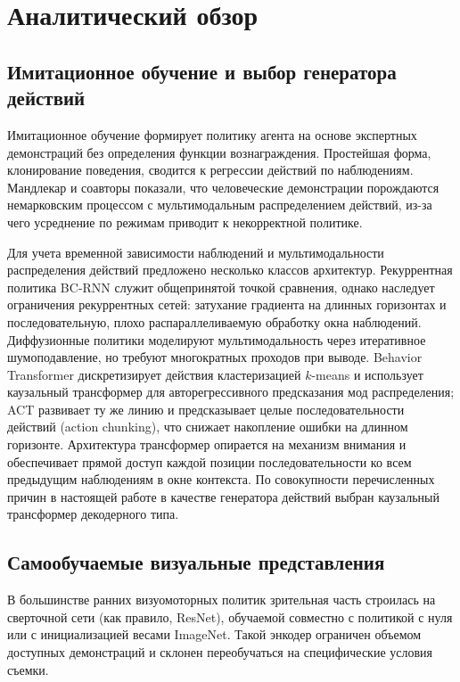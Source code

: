 \chapter{Аналитический обзор}
\label{ch:chap1}

\section{Имитационное обучение и выбор генератора действий}

Имитационное обучение формирует политику агента на основе экспертных демонстраций без определения
функции вознаграждения. Простейшая форма, клонирование поведения, сводится к регрессии действий по
наблюдениям. Мандлекар и соавторы \cite{mandlekar2021robomimic} показали, что человеческие демонстрации
порождаются немарковским процессом с мультимодальным распределением действий, из-за чего усреднение по
режимам приводит к некорректной политике.

Для учета временной зависимости наблюдений и мультимодальности распределения действий предложено несколько классов архитектур. Рекуррентная политика BC-RNN \cite{mandlekar2021robomimic} служит общепринятой точкой сравнения, однако наследует ограничения
рекуррентных сетей: затухание градиента на длинных горизонтах и последовательную, плохо распараллеливаемую обработку окна наблюдений. Диффузионные политики \cite{chi2023diffusion} моделируют мультимодальность через итеративное шумоподавление, но требуют многократных проходов при выводе. Behavior Transformer \cite{shafiullah2022behavior} дискретизирует действия кластеризацией $k$-means и использует каузальный трансформер для авторегрессивного предсказания мод распределения;
ACT \cite{zhao2023aloha} развивает ту же линию и предсказывает целые последовательности действий (action chunking), что снижает накопление ошибки на длинном горизонте. Архитектура трансформер \cite{vaswani2017attention, radford2018improving} опирается на механизм внимания и обеспечивает прямой доступ каждой позиции последовательности ко всем предыдущим наблюдениям в окне контекста. По совокупности перечисленных причин в настоящей работе в качестве генератора действий выбран каузальный трансформер декодерного типа.

\section{Самообучаемые визуальные представления}

В большинстве ранних визуомоторных политик зрительная часть строилась на сверточной сети (как правило, ResNet), обучаемой совместно с политикой с нуля или с инициализацией весами ImageNet. Такой энкодер ограничен объемом доступных демонстраций и склонен переобучаться на специфические условия съемки.

